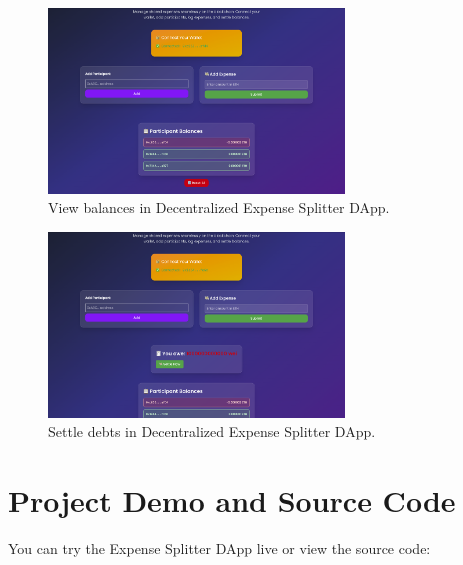 \documentclass[12pt, a4paper]{article}
\begin{document}
\begin{figure}[h]
    \centering
    \includegraphics[width=0.7\textwidth]{balance_list.png}
    \caption{View balances in Decentralized Expense Splitter DApp.}
    \label{fig:balance_list}
\end{figure}
\begin{figure}[h]
    \centering
    \includegraphics[width=0.7\textwidth]{settle.png}
    \caption{Settle debts in Decentralized Expense Splitter DApp.}
    \label{fig:settle}
\end{figure}
\section{Project Demo and Source Code}

You can try the Expense Splitter DApp live or view the source code:
\end{document}
